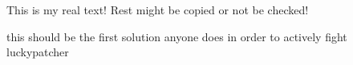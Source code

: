 This is my real text! Rest might be copied or not be checked!

this should be the first solution anyone does in order to actively fight luckypatcher
